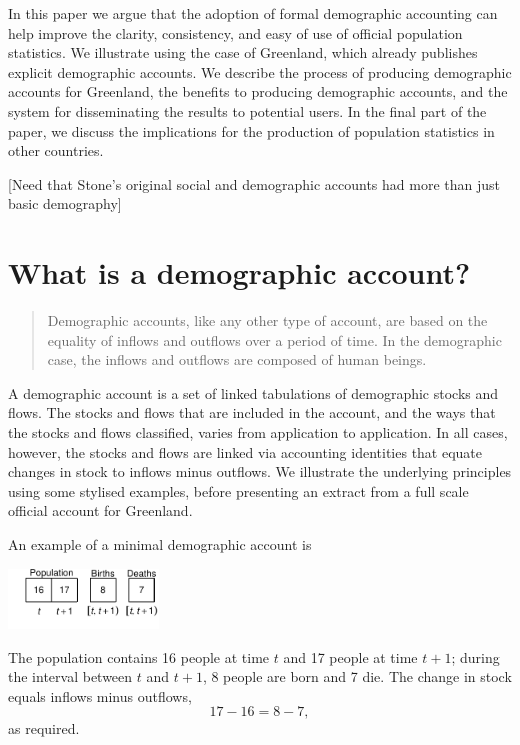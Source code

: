 \documentclass[USenglish]{article}
\begin{document}
In this paper we argue that the adoption of formal demographic accounting can help improve the clarity, consistency, and easy of use of official population statistics. We illustrate using the case of Greenland, which already publishes explicit demographic accounts. We describe the process of producing demographic accounts for Greenland, the benefits to producing demographic accounts, and the system for disseminating the results to potential users. In the final part of the paper, we discuss the implications for the production of population statistics in other countries.

[Need that Stone's original social and demographic accounts had more than just basic demography]


\section{What is a demographic account?}

\begin{quote}
Demographic accounts, like any other type of account, are based on the equality of inflows and outflows over a period of time. In the demographic case, the inflows and outflows are composed of human beings.\citep[][p. 26]{stone1984accounts}
\end{quote}

A demographic account is a set of linked tabulations of demographic stocks and flows. The stocks and flows that are included in the account, and the ways that the stocks and flows classified, varies from application to application. In all cases, however, the stocks and flows are linked via accounting identities that equate changes in stock to inflows minus outflows. We illustrate the underlying principles using some stylised examples, before presenting an extract from a full scale official account for Greenland.

An example of a minimal demographic account is
\begin{center}
\includegraphics[width=0.3\textwidth]{figures_accounts/fig_account_noage.pdf}
\end{center}
The population contains 16 people at time $t$ and 17 people at time $t+1$; during the interval between $t$ and $t+1$, 8 people are born and 7 die. The change in stock equals inflows minus outflows,
\begin{equation*}
  17 - 16 = 8 - 7,
\end{equation*}
as required.
\end{document}
